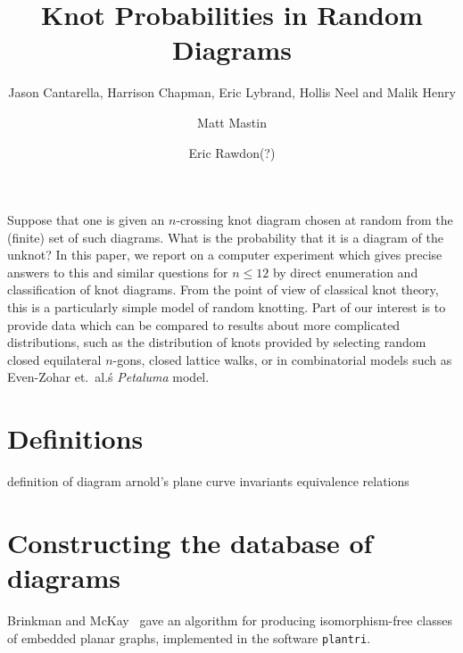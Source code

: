 \documentclass[amsmath,secnumarabic,floatfix,amssymb,nofootinbib,nobibnotes,letterpaper,11pt,tightenlines,showkeys]{revtex4}
\theoremstyle{definition}
\begin{document}
\title[]{Knot Probabilities in Random Diagrams}
\author{Jason Cantarella, Harrison Chapman, Eric Lybrand, Hollis Neel and Malik Henry}
\noaffiliation
\author{Matt Mastin}
\noaffiliation
\author{Eric Rawdon(?)}
\noaffiliation

\maketitle

Suppose that one is given an $n$-crossing knot diagram chosen at random from the (finite) set of such diagrams. What is the probability that it is a diagram of the unknot? In this paper, we report on a computer experiment which gives precise answers to this and similar questions for $n \leq 12$ by direct enumeration and classification of knot diagrams. From the point of view of classical knot theory, this is a particularly simple model of random knotting. Part of our interest is to provide data which can be compared to results about more complicated distributions, such as the distribution of knots provided by selecting random closed equilateral $n$-gons, closed lattice walks, or in combinatorial models such as Even-Zohar et.\ al.\'s \emph{Petaluma} model.

\section{Definitions}

definition of diagram
arnold's plane curve invariants
equivalence relations

\section{Constructing the database of diagrams}

Brinkman and McKay~\cite{Brinkmann:2007,McKay:1998wa} gave an algorithm for producing isomorphism-free classes of embedded planar graphs, implemented in the software \texttt{plantri}. 
\end{document}
